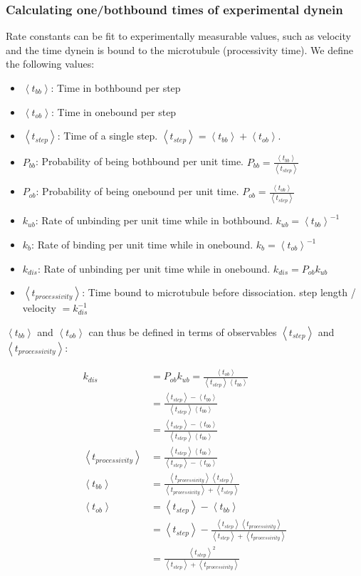 \documentclass[10pt]{article} %
\begin{document}
\subsubsection{Calculating one/bothbound times of experimental dynein}
Rate constants can be fit to experimentally measurable values, such as velocity and the time dynein is bound to the microtubule (processivity time). We define the following values:

\newcommand\tbb{\left<t_{bb}\right>}
\newcommand\tob{\left<t_{ob}\right>}
\newcommand\tstep{\left<t_{step}\right>}
\newcommand\tproc{\left<t_{processivity}\right>}
\newcommand\kub{k_{ub}}
\newcommand\kb{k_{b}}
\newcommand\ko{k_{dis}}

\begin{itemize}
\item $\tbb$: Time in bothbound per step
\item $\tob$: Time in onebound per step
\item $\tstep$: Time of a single step. $\tstep=\tbb+\tob$.
\item $P_{bb}$: Probability of being bothbound per unit time. $P_{bb} = \frac{\tbb}{\tstep}$
\item $P_{ob}$: Probability of being onebound per unit time. $P_{ob} = \frac{\tob}{\tstep}$
\item $\kub$: Rate of unbinding per unit time while in bothbound. $\kub = \tbb^{-1}$
\item $\kb$: Rate of binding per unit time while in onebound. $\kb = \tob^{-1}$
\item $\ko$: Rate of unbinding per unit time while in onebound. $\ko = P_{ob}\kub$
\item $\tproc$: Time bound to microtubule before dissociation. step length / velocity $= \ko^{-1}$
\end{itemize}

$\tbb$ and $\tob$ can thus be defined in terms of observables $\tstep$ and $\tproc$:

\begin{align*}
  \ko &= P_{ob}\kub = \frac{\tob}{\tstep\tbb}\\
  &= \frac{\tstep-\tbb}{\tstep\tbb}\\
  &= \frac{\tstep-\tbb}{\tstep\tbb}\\
  \tproc &= \frac{\tstep\tbb}{\tstep-\tbb}\\
  \tbb &= \frac{\tproc\tstep}{\tproc+\tstep}\\
  \tob &= \tstep-\tbb\\
  &= \tstep - \frac{\tstep\tproc}{\tstep+\tproc}\\
  &= \frac{\tstep^2}{\tstep+\tproc}\\
\end{align*}
\end{document}
